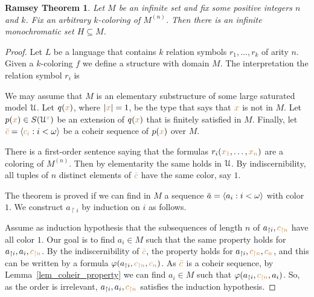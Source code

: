 \theoremstyle{mio}
\newtheorem{Ramsey}[thm]{Ramsey Theorem}
\begin{Ramsey}\label{thm_Ramsey}
Let $M$ be an infinite set and fix some positive integers $n$ and $k$.
Fix an arbitrary $k$-coloring of $M^{(n)}$.
Then there is an infinite monochromatic set $H\subseteq M$.
\end{Ramsey}
\begin{proof}
Let $L$ be a language that contains $k$ relation symbols $r_1,\dots,r_k$ of arity $n$.
Given a $k$-coloring $f$ we define a structure with domain $M$.
The interpretation the relation symbol $r_i$ is




We may assume that $M$ is an elementary substructure of some large saturated model $\EuScript U$.
Let $q({\color{brown} x})$, where $|{\color{brown} x}|=1$, be the type that says that ${\color{brown} x}$ is not in $M$.
Let $p({\color{brown} x})\in S(\EuScript U^{\color{brown} x})$ be an extension of $q({\color{brown} x})$ that is finitely satisfied in $M$.
Finally, let ${\color{brown}\bar c}=\langle{\color{brown}c_i}:i<\omega\rangle$ be a coheir sequence of $p({\color{brown} x})$ over $M$.

There is a first-order sentence saying that the formulas $r_i({\color{brown} x_1},\dots,{\color{brown} x_n})$ are a coloring of $M^{(n)}$.
Then by elementarity the same holds in $\EuScript U$.
By indiscernibility,
all tuples of $n$ distinct elements of ${\color{brown}\bar c}$ have the same color, say $1$.


The theorem is proved if we can find in $M$ a sequence $\bar a=\langle a_i:i<\omega\rangle$ with color $1$.
We construct $a_{\restriction i}$ by induction on $i$ as follows.

Assume as induction hypothesis that the subsequences of length $n$ of $a_{\restriction i},{\color{brown} c_{\restriction n}}$ have all color $1$.
Our goal is to find $a_i\in M$ such that the same property holds for $a_{\restriction i},a_i,{\color{brown} c_{\restriction n}}$.
By the indiscernibility of ${\color{brown}\bar c}$,
the property holds for  $a_{\restriction i},{\color{brown} c_{\restriction n}},{\color{brown}{c_n}}$, and this can be written by a formula $\varphi(a_{\restriction i},{\color{brown} c_{\restriction n}},{\color{brown}{c_n}})$.
As ${\color{brown}\bar c}$ is a coheir sequence,
by Lemma~\ref{lem_coheir_property} we can find  $a_i\in M$ such that  $\varphi(a_{\restriction i},{\color{brown} c_{\restriction n}},a_i)$.
So,
as the order is irrelevant,
$a_{\restriction i},a_i,{\color{brown} c_{\restriction n}}$ satisfies the induction hypothesis.
\end{proof}

